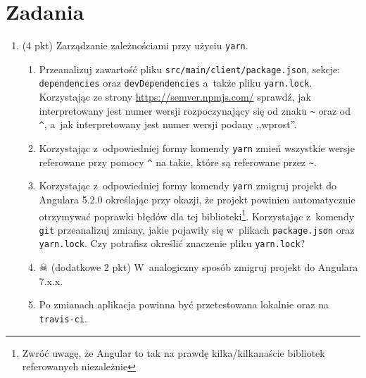 \documentclass[12pt]{article}
\begin{document}
    \section*{Zadania}
    \begin{enumerate}
        \item\label{exc:yarn}
            (4 pkt) Zarządzanie zależnościami przy użyciu \texttt{yarn}.
            \begin{enumerate}
                \item Przeanalizuj zawartość pliku \texttt{src/main/client/package.json}, sekcje: \texttt{de\-pen\-den\-cies} oraz \texttt{devDe\-pen\-den\-cies} a~także pliku \texttt{yarn.lock}. Korzystając ze strony \url{https://semver.npmjs.com/} sprawdź, jak interpretowany jest numer wersji rozpoczynający się od znaku \texttt{\textasciitilde} oraz od \texttt{\textasciicircum}, a~jak interpretowany jest numer wersji podany ,,wprost''.
                \item Korzystając z~odpowiedniej formy komendy \texttt{yarn} zmień wszystkie wersje referowane przy pomocy \texttt{\textasciicircum} na takie, które są referowane przez \texttt{\textasciitilde}.
                \item Korzystając z~odpowiedniej formy komendy \texttt{yarn} zmigruj projekt do Angulara 5.2.0 określając przy okazji, że projekt powinien automatycznie otrzymywać poprawki błędów dla tej biblioteki\footnote{Zwróć uwagę, że Angular to tak na prawdę kilka/kilkanaście bibliotek referowanych niezależnie}. Korzystając z~komendy \texttt{git} przeanalizuj zmiany, jakie pojawiły się w~plikach \texttt{package.json} oraz \texttt{yarn.lock}. Czy potrafisz określić znaczenie pliku \texttt{yarn.lock}?
				\item $\skull$ (dodatkowe 2 pkt) W~analogiczny sposób zmigruj projekt do Angulara 7.x.x.
                \item Po zmianach aplikacja powinna być przetestowana lokalnie oraz na \texttt{travis-ci}.
            \end{enumerate}


\end{enumerate}
\end{document}
